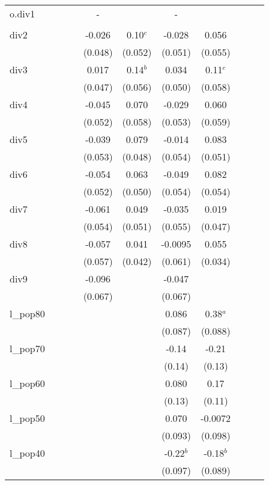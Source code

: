 \documentclass[]{article}
\begin{document}
\begin{tabular}{lcccccccccc}
o.div1 &  &  &  & - &  & - &  &  &  &  \\
 &  &  &  &  &  &  &  &  &  &  \\
div2 &  &  &  & -0.026 & 0.10$^c$ & -0.028 & 0.056 &  &  &  \\
 &  &  &  & (0.048) & (0.052) & (0.051) & (0.055) &  &  &  \\
div3 &  &  &  & 0.017 & 0.14$^b$ & 0.034 & 0.11$^c$ &  &  &  \\
 &  &  &  & (0.047) & (0.056) & (0.050) & (0.058) &  &  &  \\
div4 &  &  &  & -0.045 & 0.070 & -0.029 & 0.060 &  &  &  \\
 &  &  &  & (0.052) & (0.058) & (0.053) & (0.059) &  &  &  \\
div5 &  &  &  & -0.039 & 0.079 & -0.014 & 0.083 &  &  &  \\
 &  &  &  & (0.053) & (0.048) & (0.054) & (0.051) &  &  &  \\
div6 &  &  &  & -0.054 & 0.063 & -0.049 & 0.082 &  &  &  \\
 &  &  &  & (0.052) & (0.050) & (0.054) & (0.054) &  &  &  \\
div7 &  &  &  & -0.061 & 0.049 & -0.035 & 0.019 &  &  &  \\
 &  &  &  & (0.054) & (0.051) & (0.055) & (0.047) &  &  &  \\
div8 &  &  &  & -0.057 & 0.041 & -0.0095 & 0.055 &  &  &  \\
 &  &  &  & (0.057) & (0.042) & (0.061) & (0.034) &  &  &  \\
div9 &  &  &  & -0.096 &  & -0.047 &  &  &  &  \\
 &  &  &  & (0.067) &  & (0.067) &  &  &  &  \\
l\_pop80 &  &  &  &  &  & 0.086 & 0.38$^a$ &  &  &  \\
 &  &  &  &  &  & (0.087) & (0.088) &  &  &  \\
l\_pop70 &  &  &  &  &  & -0.14 & -0.21 &  &  &  \\
 &  &  &  &  &  & (0.14) & (0.13) &  &  &  \\
l\_pop60 &  &  &  &  &  & 0.080 & 0.17 &  &  &  \\
 &  &  &  &  &  & (0.13) & (0.11) &  &  &  \\
l\_pop50 &  &  &  &  &  & 0.070 & -0.0072 &  &  &  \\
 &  &  &  &  &  & (0.093) & (0.098) &  &  &  \\
l\_pop40 &  &  &  &  &  & -0.22$^b$ & -0.18$^b$ &  &  &  \\
 &  &  &  &  &  & (0.097) & (0.089) &  &  &  \\

\end{tabular}
\end{document}
